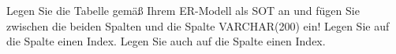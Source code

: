 \item Legen Sie die Tabelle  gemäß Ihrem ER-Modell als SOT
an und fügen Sie zwischen die beiden Spalten  und
 die Spalte  VARCHAR(200) ein!
Legen Sie auf die Spalte  einen Index. Legen Sie auch
auf die Spalte  einen Index.

